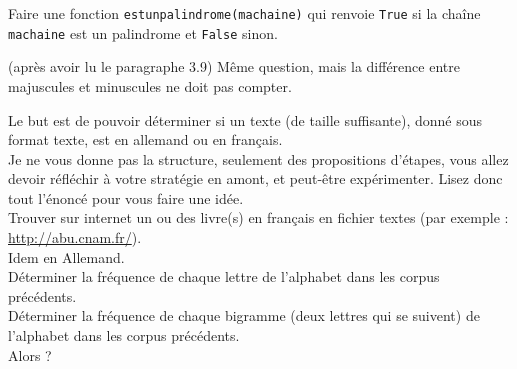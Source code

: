 \begin{enonce}
\ques Faire une fonction \texttt{estunpalindrome(machaine)} qui renvoie \texttt{True} si la chaîne \texttt{machaine} est un palindrome et \texttt{False} sinon.


\ques (après avoir lu le paragraphe 3.9) Même question, mais la différence entre majuscules et minuscules ne doit pas compter.


\begin{enonce}

Le but est de pouvoir   déterminer si un texte (de taille suffisante),  donné sous format texte, est en allemand ou en français.
\\

Je ne vous donne pas la structure, seulement des propositions d'étapes,  vous allez devoir  réfléchir  à votre stratégie en amont, et peut-être expérimenter. Lisez donc tout l'énoncé pour vous faire une idée.\\


\nipuce  Trouver sur internet un ou des livre(s) en français en fichier textes (par exemple : \href{http://abu.cnam.fr/} {http://abu.cnam.fr/}).\\

\nipuce  Idem en Allemand.\\

\nipuce Déterminer la fréquence de chaque lettre de l'alphabet dans les corpus précédents.\\

\nipuce Déterminer la fréquence de chaque bigramme (deux lettres qui se suivent) de l'alphabet dans les corpus précédents.\\

\nipuce  Alors ?

\end{enonce}

\begin{correction}

\end{correction}



\end{enonce}

\begin{correction}

\end{correction}


